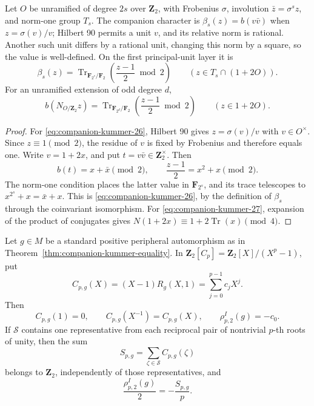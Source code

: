 \begin{lemma}\label{lem:companion-first-layer}
Let \(O\) be unramified of degree \(2s\) over \(\mathbf Z_2\),
with Frobenius \(\sigma\), involution \(\bar z=\sigma^s z\),
and norm-one group \(T_s\). The companion character is
\(\beta_s(z)=b(v\bar v)\) when \(z=\sigma(v)/v\);
Hilbert 90 permits a unit \(v\), and its relative norm is rational.
Another such unit differs by a rational unit, changing this norm
by a square, so the value is well-defined.
On the first principal-unit layer it is
\begin{equation}
 \beta_s(z)=\operatorname{Tr}_{\mathbf F_{2^s}/\mathbf F_2}
                   \left(\frac{z-1}{2}\bmod2\right)
       \qquad(z\in T_s\cap(1+2O)).                       
\label{eq:companion-kummer-26}
\end{equation}
For an unramified extension of odd degree \(d\),
\begin{equation}
 b(N_{O/\mathbf Z_2}z)
       =\operatorname{Tr}_{\mathbf F_{2^d}/\mathbf F_2}
                   \left(\frac{z-1}{2}\bmod2\right)
       \qquad(z\in1+2O).                                 
\label{eq:companion-kummer-27}
\end{equation}
\end{lemma}

\begin{proof}
For \eqref{eq:companion-kummer-26}, Hilbert 90 gives \(z=\sigma(v)/v\) with \(v\in O^\times\).
Since \(z\equiv1\pmod2\), the residue of \(v\) is fixed by Frobenius
and therefore equals one. Write \(v=1+2x\), and put
\(t=v\bar v\in\mathbf Z_2^\times\). Then
\[
 b(t)=x+\bar x\pmod2,
 \qquad \frac{z-1}{2}=x^2+x\pmod2.
\]
The norm-one condition places the latter value in
\(\mathbf F_{2^s}\), and its trace telescopes to
\(x^{2^s}+x=\bar x+x\). This is \eqref{eq:companion-kummer-26}, by the definition
of \(\beta_s\) through the coinvariant isomorphism.
For \eqref{eq:companion-kummer-27}, expansion of the product of conjugates gives
\(N(1+2x)\equiv1+2\operatorname{Tr}(x)\pmod4\).
\end{proof}

\begin{lemma}\label{lem:cyclic-kummer-fourier}
Let \(g\in M\) be a standard positive peripheral automorphism as
in Theorem~\ref{thm:companion-kummer-equality}. In
\(\mathbf Z_2[C_p]=\mathbf Z_2[X]/(X^p-1)\), put
\[
        C_{p,g}(X)=(X-1)R_g(X,1)=\sum_{j=0}^{p-1}c_jX^j.
\]
Then
\begin{equation}
 C_{p,g}(1)=0,\qquad C_{p,g}(X^{-1})=C_{p,g}(X),
 \qquad \rho_{p,2}^I(g)=-c_0.                            
\label{eq:companion-kummer-28}
\end{equation}
If \(\mathcal S\) contains one representative from each reciprocal
pair of nontrivial \(p\)-th roots of unity, then the sum
\[
                S_{p,g}=\sum_{\zeta\in\mathcal S}C_{p,g}(\zeta)
\]
belongs to \(\mathbf Z_2\), independently of those representatives,
and
\begin{equation}
                 \frac{\rho_{p,2}^I(g)}2=-\frac{S_{p,g}}p.
\label{eq:companion-kummer-29}
\end{equation}
\end{lemma}

